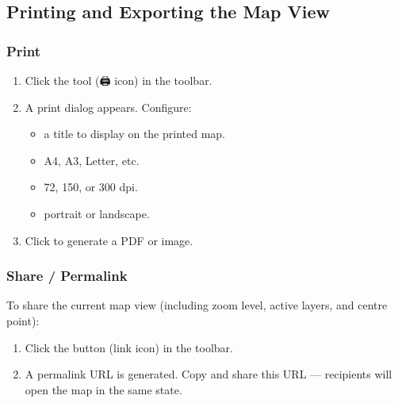 \documentclass[letterpaper,10pt,english]{sphinxmanual}
\begin{document}
\subsection{Printing and Exporting the Map View}
\label{\detokenize{en/04_exploring_maps:printing-and-exporting-the-map-view}}

\subsubsection{Print}
\label{\detokenize{en/04_exploring_maps:print}}\begin{enumerate}
%
\item {} 
\sphinxAtStartPar
Click the  tool (🖨 icon) in the toolbar.

\item {} 
\sphinxAtStartPar
A print dialog appears. Configure:
\begin{itemize}
\item {} 
\sphinxAtStartPar
{} \textendash{} a title to display on the printed map.

\item {} 
\sphinxAtStartPar
{} \textendash{} A4, A3, Letter, etc.

\item {} 
\sphinxAtStartPar
{} \textendash{} 72, 150, or 300 dpi.

\item {} 
\sphinxAtStartPar
{} \textendash{} portrait or landscape.

\end{itemize}

\item {} 
\sphinxAtStartPar
Click  to generate a PDF or image.

\end{enumerate}


\subsubsection{Share / Permalink}
\label{\detokenize{en/04_exploring_maps:share-permalink}}
\sphinxAtStartPar
To share the current map view (including zoom level, active layers, and centre point):
\begin{enumerate}
%
\item {} 
\sphinxAtStartPar
Click the  button (link icon) in the toolbar.

\item {} 
\sphinxAtStartPar
A permalink URL is generated. Copy and share this URL — recipients will open the map
in the same state.

\end{enumerate}
\end{document}
